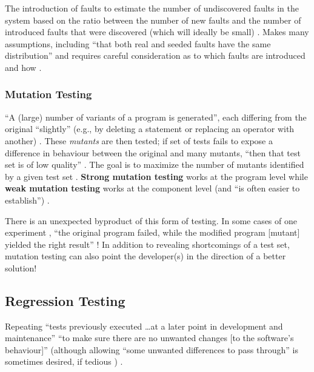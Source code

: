 The introduction of faults to estimate the number of undiscovered faults in the
system based on the ratio between the number of new faults and the number of
introduced faults that were discovered (which will ideally be small)
\cite[p.~427]{van_vliet_software_2000}. Makes many assumptions, including
``that both real and seeded faults have the same distribution'' and requires
careful consideration as to which faults are introduced and how
\cite[p.~427]{van_vliet_software_2000}.

\subsubsection{Mutation Testing \cite[pp.~428-429]{van_vliet_software_2000}}
\label{chap:notes:sec:mutation-testing}

``A (large) number of variants of a program is generated'', each differing from
the original ``slightly'' (e.g., by deleting a statement or replacing an
operator with another) \cite[p.~428]{van_vliet_software_2000}. These
\emph{mutants} are then tested; if set of tests fails to expose a difference in
behaviour between the original and many mutants, ``then that test set is of low
quality'' \cite[pp.~428-429]{van_vliet_software_2000}. The goal is to maximize
the number of mutants identified by a given test set
\cite[p.~429]{van_vliet_software_2000}. \textbf{Strong mutation testing} works
at the program level while \textbf{weak mutation testing} works at the
component level (and ``is often easier to establish'')
\cite[p.~429]{van_vliet_software_2000}.

There is an unexpected byproduct of this form of testing. In some cases of one
experiment , ``the original program failed,
while the modified program [mutant] yielded the right result''
\cite[p.~432]{van_vliet_software_2000}! In addition to revealing shortcomings
of a test set, mutation testing can also point the developer(s) in the
direction of a better solution!

\subsection{Regression Testing}
\label{chap:notes:sec:regression-testing}

Repeating ``tests previously executed \dots at a later point in development and
maintenance'' \cite[p.~446]{peters_software_2000} ``to make sure there are no
unwanted changes [to the software's behaviour]'' (although allowing ``some
unwanted differences to pass through'' is sometimes desired, if tedious
\cite[p.~482]{peters_software_2000}) \cite[p.~481]{peters_software_2000}.

